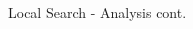 \begin{frame}{Local Search - Analysis cont.}
\begin{columns}
\begin{column}{1.2\textwidth}
\begin{center}

\end{center}
\end{column}
\end{columns}
\end{frame}